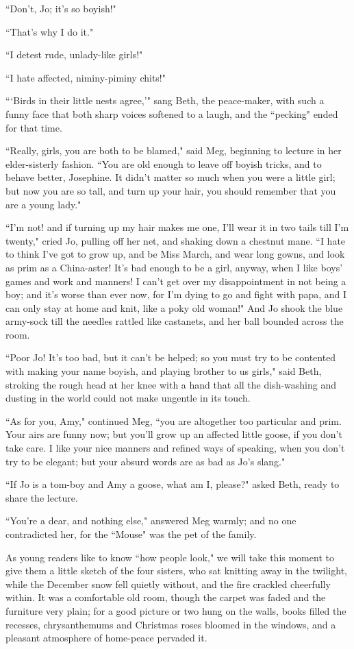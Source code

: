 ``Don't, Jo; it's so boyish!"

``That's why I do it."

``I detest rude, unlady-like girls!"

``I hate affected, niminy-piminy chits!"

```Birds in their little nests agree,'"
sang Beth, the peace-maker, with such a funny face that both sharp
voices softened to a laugh, and the ``pecking" ended for that time.

``Really, girls, you are both to be blamed," said Meg, beginning to
lecture in her elder-sisterly fashion. ``You are old enough to leave off
boyish tricks, and to behave better, Josephine. It
didn't matter so much when you were a little girl; but
now you are so tall, and turn up your hair, you should remember that you
are a young lady."

``I'm not! and if turning up my hair makes me one,
I'll wear it in two tails till I'm
twenty," cried Jo, pulling off her net, and shaking down a chestnut
mane. ``I hate to think I've got to grow up, and be Miss
March, and wear long gowns, and look as prim as a China-aster!
It's bad enough to be a girl, anyway, when I like
boys' games and work and manners! I
can't get over my disappointment in not being a boy; and
it's worse than ever now, for I'm dying
to go and fight with papa, and I can only stay at home and knit, like a
poky old woman!" And Jo shook the blue army-sock till the needles
rattled like castanets, and her ball bounded across the room.

``Poor Jo! It's too bad, but it can't be
helped; so you must try to be contented with making your name boyish,
and playing brother to us girls," said Beth, stroking the rough head at
her knee with a hand that all the dish-washing and dusting in the world
could not make ungentle in its touch.

``As for you, Amy," continued Meg, ``you are altogether too particular and
prim. Your airs are funny now; but you'll grow up an
affected little goose, if you don't take care. I like
your nice manners and refined ways of speaking, when you
don't try to be elegant; but your absurd words are as
bad as Jo's slang."

``If Jo is a tom-boy and Amy a goose, what am I, please?" asked Beth,
ready to share the lecture.

``You're a dear, and nothing else," answered Meg warmly;
and no one contradicted her, for the ``Mouse" was the pet of the family.

As young readers like to know ``how people look," we will take this
moment to give them a little sketch of the four sisters, who sat
knitting away in the twilight, while the December snow fell quietly
without, and the fire crackled cheerfully within. It was a comfortable
old room, though the carpet was faded and the furniture very plain; for
a good picture or two hung on the walls, books filled the recesses,
chrysanthemums and Christmas roses bloomed in the windows, and a
pleasant atmosphere of home-peace pervaded it.


